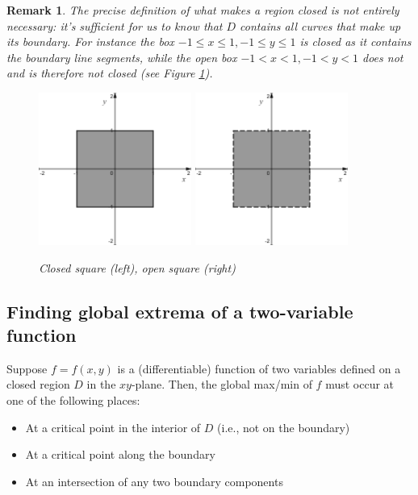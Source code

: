 \documentclass[12pt]{article}
\numberwithin{equation}{subsection}
\numberwithin{figure}{subsection}
\theoremstyle{note}
\newtheorem{remark}[subsection]{Remark}
\begin{document}
{\begin{remark} The precise definition of what makes a region closed is not entirely necessary: it's sufficient for us to know that $D$ contains all curves that make up its boundary. For instance the box $-1\leq x\leq 1, -1\leq y\leq 1$ is closed as it contains the boundary line segments, while the open box $-1<x<1, -1<y<1$ does not and is therefore not closed (see Figure \ref{fig-squares}).
\begin{figure}[h]
\centering
\includegraphics[width=50mm]{Images/closed} \qquad \qquad \qquad \includegraphics[width=50mm]{Images/open}
\caption{Closed square (left), open square (right)}
\label{fig-squares}
\end{figure}
\end{remark}

\subsection{Finding global extrema of a two-variable function}Suppose $f=f(x,y)$ is a (differentiable) function of two variables defined on a closed region $D$ in the $xy$-plane. Then, the global max/min of $f$ must occur at one of the following places:

\begin{itemize}
	\item At a critical point in the interior of $D$ (i.e., not on the boundary)
	\item At a critical point along the boundary
	\item At an intersection of any two boundary components
\end{itemize}

}
\end{document}
